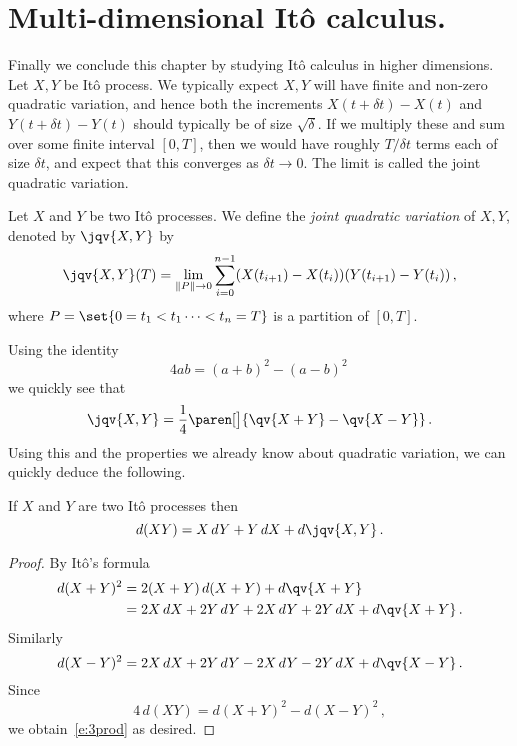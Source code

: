 \section{Multi-dimensional It\^o calculus.}

Finally we conclude this chapter by studying It\^o calculus in higher dimensions.
Let $X, Y$ be It\^o process.
We typically expect $X,Y$ will have finite and non-zero quadratic variation, and hence both the increments $X(t +\delta t) - X(t)$ and $Y(t + \delta t) - Y(t)$ should typically be of size $\sqrt{\delta}$.
If we multiply these and sum over some finite interval $[0, T]$, then we would have roughly $T / \delta t$ terms each of size $\delta t$, and expect that this converges as $\delta t \to 0$.
The limit is called the joint quadratic variation.

\begin{definition}
  Let $X$ and $Y$ be two It\^o processes.
  We define the \emph{joint quadratic variation} of $X, Y$, denoted by $\jqv{X, Y}$ by 
  \begin{equation*}
    \jqv{X,Y}(T) = \lim_{\norm{P} \to 0} \sum_{i=0}^{n-1}(X(t_{i+1}) - X(t_i)) (Y(t_{i+1}) - Y(t_i))\,,
  \end{equation*}
  where $P = \set{0 = t_1 < t_1 \cdots < t_n = T}$ is a partition of $[0, T]$.
\end{definition}

Using the identity
\begin{equation*}
  4ab = (a+b)^2 - (a - b)^2\,
\end{equation*}
we quickly see that
\begin{equation}\label{e:3plgm}
  \jqv{X,Y} = \frac{1}{4} \paren[\big]{ \qv{X+Y} - \qv{X-Y} }\,.
\end{equation}
Using this and the properties we already know about quadratic variation, we can quickly deduce the following.
\begin{proposition}
  If $X$ and $Y$ are two It\^o processes then
  \begin{equation}\label{e:3prod}
    d(XY) = X \, dY + Y \, dX + d\jqv{X,Y}\,.
  \end{equation}
\end{proposition}
\begin{proof}
  By It\^o's formula
  \begin{align*}
    d(X+Y)^2 &= 2 (X + Y) \, d(X+Y) + d\qv{X+Y}\,
    \\
      &= 2 X \, dX + 2 Y \, dY + 2 X \, dY + 2 Y \, dX + d\qv{X+Y}\,.
  \end{align*}
  Similarly 
  \begin{equation*}
    d(X-Y)^2 = 2 X \, dX + 2 Y \, dY - 2 X \, dY - 2 Y \, dX + d\qv{X-Y}\,.
  \end{equation*}
  Since 
  \begin{equation*}
    4 \, d (XY) = d(X+Y)^2 - d( X-Y)^2\,,
  \end{equation*}
  we obtain~\eqref{e:3prod} as desired.
\end{proof}

